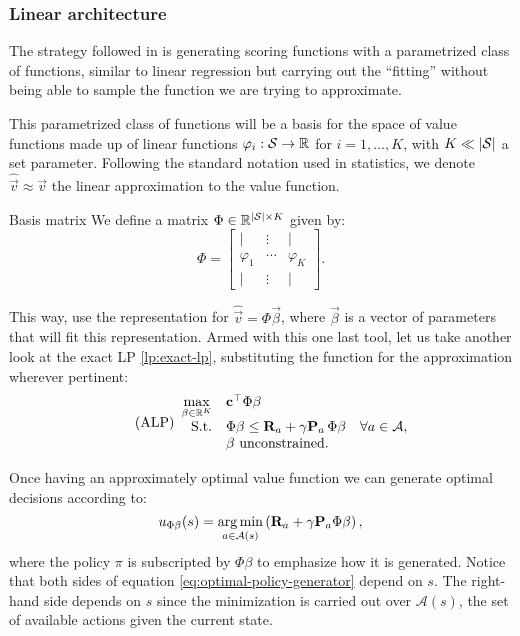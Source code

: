 \subsubsection{Linear architecture}
The strategy followed in \cite{farias2002thesis} is generating scoring functions
with a pa\-ra\-me\-trized class of functions, similar to linear regression but
carrying out the ``fitting'' without being able to sample the function we are
trying to approximate.

This parametrized class of functions will be a basis for the space of value
functions made up of linear functions $\varphi_i : \mathcal{S} \to \mathbb{R}$ for $i = 1,
\dots, K$, with $K \ll |\mathcal{S}|$ a set parameter. Following the standard
notation used in statistics, we denote $\widehat{\vec{v}} \approx \vec{v}$ the
linear approximation to the value function.

\begin{dfn}{Basis matrix}{}
    We define a matrix $\Phi \in \mathbb{R}^{|\mathcal{S}| \times K}$ given by:
    \[
        \Phi =
        \begin{bmatrix}
            | & \vdots & | \\
            \varphi_1 & \cdots & \varphi_K \\
            | & \vdots & |
        \end{bmatrix}.
    \]
\end{dfn}

This way, use the representation for $\widehat{\vec{v}} = \Phi \vec{\beta}$,
where $\vec{\beta}$ is a vector of parameters that will fit this representation.
Armed with this one last tool, let us take another look at the exact LP
\eqref{lp:exact-lp}, substituting the function for the approximation wherever
pertinent:
\begin{equation}
\label{lp:approx-lp}
\tag{ALP}
\begin{array}{rl@{}ll}
    \displaystyle \max_{\vec{\beta} \in \R^{K}} & \vec{c}^{\top} \Phi \vec{\beta} \\
    \text{S.t.} & \displaystyle \Phi \vec{\beta} \leq \vec{R}_a + \gamma \vec{P}_a \, \Phi \vec{\beta} & \quad \forall a \in \Actions, \\
    & \vec{\beta} \text{ unconstrained}.
\end{array}
\end{equation}

Once having an approximately optimal value function we can generate optimal
decisions according to:
\begin{equation}
    \label{eq:optimal-policy-generator}
    u_{\Phi \beta} (s) = \operatorname*{arg\,min}_{a \in \mathcal{A}(s)} \left( \mathbf{R}_a + \gamma \mathbf{P}_a \Phi \beta \right),
\end{equation}
where the policy $\pi$ is subscripted by $\Phi\beta$ to emphasize how it is
generated. Notice that both sides of equation
\eqref{eq:optimal-policy-generator} depend on $s$. The right-hand side depends
on $s$ since the minimization is carried out over $\mathcal{A}(s)$, the set of
available actions given the current state.

